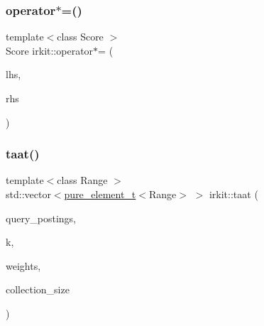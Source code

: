 \subsubsection{\texorpdfstring{operator$\ast$=()}{operator*=()}}
{\footnotesize\ttfamily template$<$class Score $>$ \\
Score irkit\+::operator$\ast$= (\begin{DoxyParamCaption}\item[{Score \&}]{lhs,  }\item[{const \hyperlink{structirkit_1_1IdWeight}{Id\+Weight} \&}]{rhs }\end{DoxyParamCaption})}

\mbox{\label{namespaceirkit_a2920c3041cd301d3dbe9d27178711ff8}} 
\subsubsection{\texorpdfstring{taat()}{taat()}}
{\footnotesize\ttfamily template$<$class Range $>$ \\
std\+::vector$<$\hyperlink{namespaceirkit_afcffab67300c5c703cb38a363c9a6f1d}{pure\+\_\+element\+\_\+t}$<$Range$>$ $>$ irkit\+::taat (\begin{DoxyParamCaption}\item[{const std\+::vector$<$ Range $>$ \&}]{query\+\_\+postings,  }\item[{std\+::size\+\_\+t}]{k,  }\item[{const std\+::vector$<$ \hyperlink{namespaceirkit_a754dabe3346f950c948e7596d9d46c71}{score\+\_\+t}$<$ \hyperlink{namespaceirkit_afcffab67300c5c703cb38a363c9a6f1d}{pure\+\_\+element\+\_\+t}$<$ Range $>$$>$$>$ \&}]{weights,  }\item[{std\+::size\+\_\+t}]{collection\+\_\+size }\end{DoxyParamCaption})}

\mbox{\label{namespaceirkit_a72c284d98cc7a897b52dd197bdf8ee47}} 
